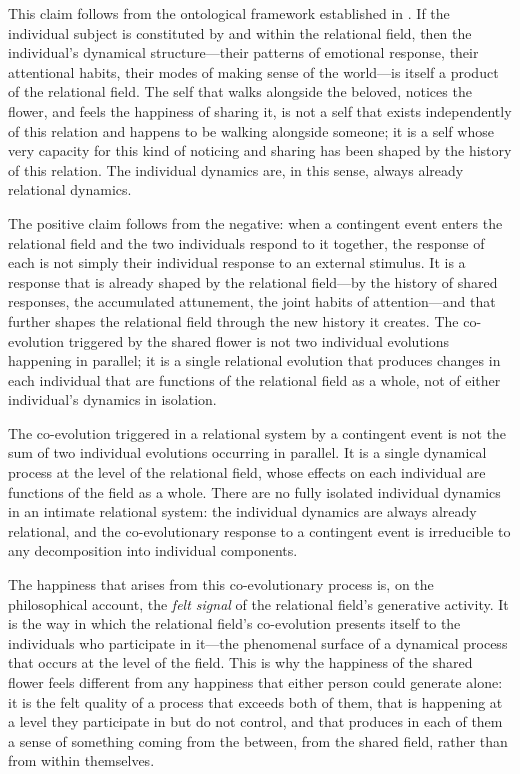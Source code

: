 This claim follows from the ontological framework established in . If the individual subject is constituted by and within the relational field, then the individual's dynamical structure---their patterns of emotional response, their attentional habits, their modes of making sense of the world---is itself a product of the relational field. The self that walks alongside the beloved, notices the flower, and feels the happiness of sharing it, is not a self that exists independently of this relation and happens to be walking alongside someone; it is a self whose very capacity for this kind of noticing and sharing has been shaped by the history of this relation. The individual dynamics are, in this sense, always already relational dynamics.

The positive claim follows from the negative: when a contingent event enters the relational field and the two individuals respond to it together, the response of each is not simply their individual response to an external stimulus. It is a response that is already shaped by the relational field---by the history of shared responses, the accumulated attunement, the joint habits of attention---and that further shapes the relational field through the new history it creates. The co-evolution triggered by the shared flower is not two individual evolutions happening in parallel; it is a single relational evolution that produces changes in each individual that are functions of the relational field as a whole, not of either individual's dynamics in isolation.

\begin{claim}
The co-evolution triggered in a relational system by a contingent event is not the sum of two individual evolutions occurring in parallel. It is a single dynamical process at the level of the relational field, whose effects on each individual are functions of the field as a whole. There are no fully isolated individual dynamics in an intimate relational system: the individual dynamics are always already relational, and the co-evolutionary response to a contingent event is irreducible to any decomposition into individual components.
\end{claim}

The happiness that arises from this co-evolutionary process is, on the philosophical account, the \emph{felt signal} of the relational field's generative activity. It is the way in which the relational field's co-evolution presents itself to the individuals who participate in it---the phenomenal surface of a dynamical process that occurs at the level of the field. This is why the happiness of the shared flower feels different from any happiness that either person could generate alone: it is the felt quality of a process that exceeds both of them, that is happening at a level they participate in but do not control, and that produces in each of them a sense of something coming from the between, from the shared field, rather than from within themselves.

